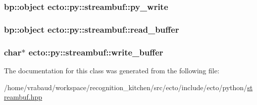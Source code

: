 \hypertarget{classecto_1_1py_1_1streambuf_aad739c2392d3c8f0de7d44719c7cc37a}{
\subsubsection[{py\-\_\-write}]{\setlength{\rightskip}{0pt plus 5cm}bp\-::object ecto\-::py\-::streambuf\-::py\-\_\-write\hspace{0.3cm}{\ttfamily [private]}}}\label{classecto_1_1py_1_1streambuf_aad739c2392d3c8f0de7d44719c7cc37a}
\hypertarget{classecto_1_1py_1_1streambuf_ac239012691e5d3485572159a53600005}{
\subsubsection[{read\-\_\-buffer}]{\setlength{\rightskip}{0pt plus 5cm}bp\-::object ecto\-::py\-::streambuf\-::read\-\_\-buffer\hspace{0.3cm}{\ttfamily [private]}}}\label{classecto_1_1py_1_1streambuf_ac239012691e5d3485572159a53600005}
\hypertarget{classecto_1_1py_1_1streambuf_a331e541fac616ac9ac3a81fb117057c6}{
\subsubsection[{write\-\_\-buffer}]{\setlength{\rightskip}{0pt plus 5cm}char$\ast$ ecto\-::py\-::streambuf\-::write\-\_\-buffer\hspace{0.3cm}{\ttfamily [private]}}}\label{classecto_1_1py_1_1streambuf_a331e541fac616ac9ac3a81fb117057c6}


The documentation for this class was generated from the following file\-:\begin{DoxyCompactItemize}
\item 
/home/vrabaud/workspace/recognition\-\_\-kitchen/src/ecto/include/ecto/python/\hyperlink{streambuf_8hpp}{streambuf.\-hpp}\end{DoxyCompactItemize}
